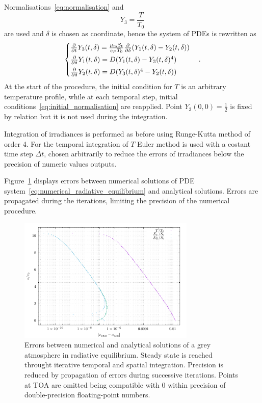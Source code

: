\documentclass[a4paper,10pt,twocolumn,\classoptions]{article}
\begin{document}
Normalisations~\eqref{eq:normalisation} and
\begin{equation}
  \label{eq:temperature_normalisation}
  Y_3 = \frac{T}{T_0}
\end{equation}
are used and $\delta$ is chosen as coordinate, hence the system of PDEs is rewritten as
\begin{equation}
  \label{eq:numerical_radiative_equilibrium}
  \left\{
  \begin{array}{@{}l@{}}
    \pdv*{Y_3(t, \delta)}{t} = \frac{\mu_\text{m} S_\text{t}}{c_P T_0} \pdv*{(Y_1(t, \delta) - Y_2(t, \delta))}{\delta} \\[0.5em]
    \pdv*{Y_1(t, \delta)}{\delta} = D (Y_1(t, \delta) - Y_3(t, \delta)^4) \\[0.5em]
    \pdv*{Y_2(t, \delta)}{\delta} = D (Y_3(t, \delta)^4 - Y_2(t, \delta))
  \end{array}
  \right.
  \quad .
\end{equation}
At the start of the procedure, the initial condition for $T$ is an arbitrary temperature profile, while at each temporal step, initial conditions~\eqref{eq:initial_normalisation} are reapplied. Point $Y_3(0, 0) = \frac{1}{2}$ is fixed by relation but it is not used during the integration.

Integration of irradiances is performed as before using Runge-Kutta method of order 4. For the temporal integration of $T$ Euler method is used with a costant time step $\Delta t$, chosen arbitrarily to reduce the errors of irradiances below the precision of numeric values outputs.

Figure~\ref{fig:errors_PDE} displays errors between numerical solutions of PDE system~\eqref{eq:numerical_radiative_equilibrium} and analytical solutions. Errors are propagated during the iterations, limiting the precision of the numerical procedure.
\begin{figure}[h]
  \centering
  \includegraphics*[keepaspectratio=true,width=0.75\textwidth]{errors_PDE}
  \caption{Errors between numerical and analytical solutions of a grey atmosphere in radiative equilibrium. Steady state is reached throught iterative temporal and spatial integration. Precision is reduced by propagation of errors during successive iterations. Points at TOA are omitted being compatible with 0 within precision of double-precision floating-point numbers.}
  \label{fig:errors_PDE}
\end{figure}
\end{document}
